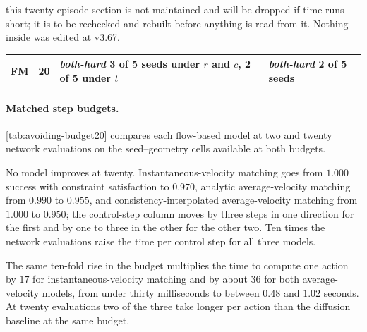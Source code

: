 \begin{deadblock}{this twenty-episode section is not maintained and will be dropped if time runs short; it
is to be rechecked and rebuilt before anything is read from it. Nothing inside was edited at v3.67.}
\begin{table}[htpb]
\begin{tabularx}{\linewidth}{@{}l r L L@{}}
    FM & 20 & \emph{both-hard} 3 of 5 seeds under $r$ and $c$, 2 of 5 under $t$ & \emph{both-hard} 2 of 5 seeds \\
    \bottomrule
  \end{tabularx}
\end{table}

\paragraph{Matched step budgets.}

\autoref{tab:avoiding-budget20} compares each flow-based model at two and twenty network evaluations
on the seed--geometry cells available at both budgets.

No model improves at twenty. Instantaneous-velocity matching goes from $1.000$ success with constraint
satisfaction to $0.970$, analytic average-velocity matching from $0.990$ to $0.955$, and
consistency-interpolated average-velocity matching from $1.000$ to $0.950$; the control-step column moves
by three steps in one direction for the first and by one to three in the other for the other two. Ten
times the network evaluations raise the time per control step for all three models.

The same ten-fold rise in the budget multiplies the time to
compute one action by $17$ for instantaneous-velocity matching and by about $36$ for both
average-velocity models, from under thirty milliseconds to between $0.48$ and $1.02$ seconds. At twenty
evaluations two of the three take longer per action than the diffusion baseline at the same budget.


\end{deadblock}
